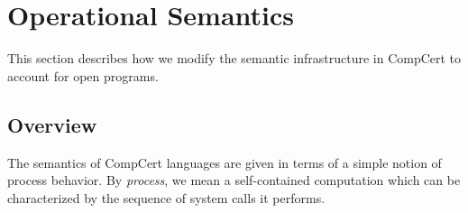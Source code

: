 \documentclass[sigplan,10pt,review,anonymous]{acmart}
\begin{document}




\section{Operational Semantics} \label{sec:sem} %

This section describes how we modify
the semantic infrastructure in CompCert
to account for open programs.


\subsection{Overview} \label{sec:sem:overview} %

The semantics of CompCert languages
are given in terms of a simple notion of process behavior.
By \emph{process}, we mean a self-contained computation
which can be characterized by
the sequence of system calls it performs.
\end{document}

